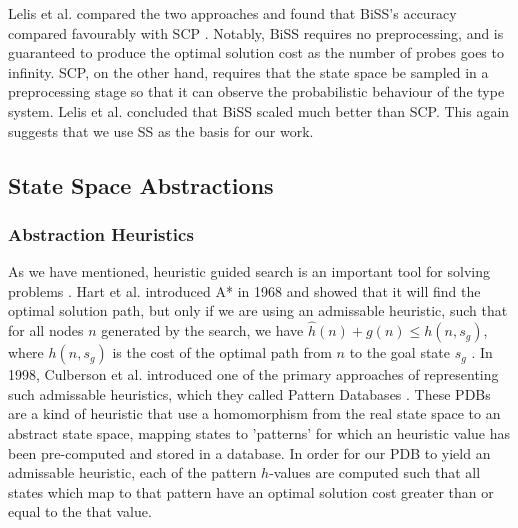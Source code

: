 \documentclass{article}
\begin{document}
Lelis et al. compared the two approaches  and found that BiSS's
accuracy compared favourably with SCP \cite{lelis2012predicting}.
Notably, BiSS requires no preprocessing, and is guaranteed to produce the optimal solution cost
as the number of probes goes to infinity.
SCP, on the other hand, requires that the state space be sampled in a preprocessing
stage so that it can observe the probabilistic behaviour of the type system. Lelis et al. concluded
that BiSS scaled much better than SCP. This again suggests that we use SS as the basis for our work.

\subsection{State Space Abstractions}

\subsubsection*{Abstraction Heuristics}

As we have mentioned, heuristic guided search is an important tool for solving problems .
Hart et al. introduced A* in 1968 \cite{hart1968formal}  and showed that it will find the optimal solution path,
but only if we are using an admissable heuristic, such that for all nodes \(n\) generated by the search,
we have \(\hat{h}(n) + g(n) \leq h(n, s_g)\), where \(h(n, s_g)\) is
the cost of the optimal path from \(n\) to the goal state \(s_g\) \cite{pearl1984heuristics}.
In 1998, Culberson et al. introduced one of the primary approaches of representing such admissable heuristics,
which they called Pattern Databases \cite{culberson1998pattern}.
These PDBs are a kind of heuristic that use a homomorphism from the real state
space to an abstract state space, mapping states to 'patterns'
for which an heuristic value has been pre-computed and stored in a database.
In order for our PDB to yield an admissable heuristic,
each of the pattern \(h\)-values are computed such that all states which map to that pattern have an optimal solution cost greater than
or equal to the that value. \\
\end{document}
